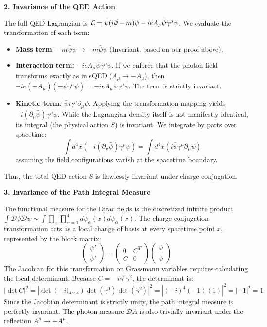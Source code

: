 \textbf{2. Invariance of the QED Action}

The full QED Lagrangian is $\mathcal{L} = \bar{\psi}(i\slashed{\partial} - m)\psi - ieA_\mu \bar{\psi}\gamma^\mu\psi$. We evaluate the transformation of each term:
\begin{itemize}
    \item \textbf{Mass term:} $-m\bar{\psi}\psi \to -m\bar{\psi}\psi$ (Invariant, based on our proof above).
    \item \textbf{Interaction term:} $-ieA_\mu \bar{\psi}\gamma^\mu\psi$. If we enforce that the photon field transforms exactly as in sQED ($A_\mu \to -A_\mu$), then $-ie(-A_\mu)(-\bar{\psi}\gamma^\mu\psi) = -ieA_\mu \bar{\psi}\gamma^\mu\psi$. The term is strictly invariant.
    \item \textbf{Kinetic term:} $\bar{\psi}i\gamma^\mu\partial_\mu\psi$. Applying the transformation mapping yields $-i(\partial_\mu \bar{\psi}) \gamma^\mu \psi$. While the Lagrangian density itself is not manifestly identical, its integral (the physical action $S$) is invariant. We integrate by parts over spacetime:
          \[
              \int d^4x \left( -i (\partial_\mu \bar{\psi}) \gamma^\mu \psi \right) = \int d^4x \left( i \bar{\psi} \gamma^\mu \partial_\mu \psi \right)
          \]
          assuming the field configurations vanish at the spacetime boundary.
\end{itemize}
Thus, the total QED action $S$ is flawlessly invariant under charge conjugation.

\textbf{3. Invariance of the Path Integral Measure}

The functional measure for the Dirac fields is the discretized infinite product $\int \mathcal{D}\bar{\psi}\mathcal{D}\psi \sim \int \prod_x \prod_{\alpha=1}^4 d\bar{\psi}_\alpha(x) d\psi_\alpha(x)$. The charge conjugation transformation acts as a local change of basis at every spacetime point $x$, represented by the block matrix:
\[
    \begin{pmatrix} \psi' \\ \bar{\psi}' \end{pmatrix} = \begin{pmatrix} 0 & C^T \\ C & 0 \end{pmatrix} \begin{pmatrix} \psi \\ \bar{\psi} \end{pmatrix}
\]
The Jacobian for this transformation on Grassmann variables requires calculating the local determinant. Because $C = -i\gamma^0\gamma^2$, the determinant is:
\[
    |\det C|^2 = |\det(-i\mathbb{I}_{4\times 4}) \det(\gamma^0) \det(\gamma^2)|^2 = |(-i)^4 (-1) (1)|^2 = |-1|^2 = 1
\]
Since the Jacobian determinant is strictly unity, the path integral measure is perfectly invariant. The photon measure $\mathcal{D}A$ is also trivially invariant under the reflection $A^\mu \to -A^\mu$.

